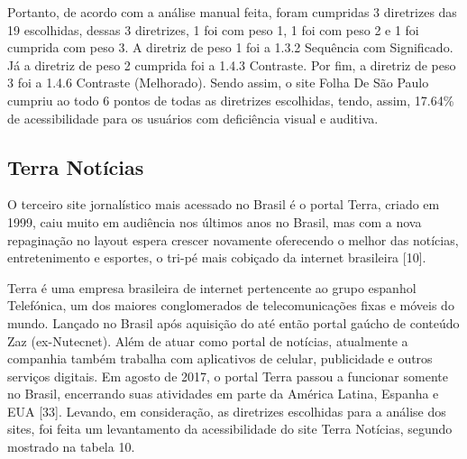 \documentclass[a4paper]{article}
\begin{document}
\begin{titlepage}
Portanto, de acordo com a análise manual feita, foram cumpridas 3 diretrizes das 19 escolhidas, dessas 3 diretrizes, 1 foi com peso 1, 1 foi com peso 2 e 1 foi cumprida com peso 3. A diretriz de peso 1 foi a 1.3.2 Sequência com Significado. Já a diretriz de peso 2 cumprida foi a 1.4.3 Contraste. Por fim, a diretriz de peso 3 foi a 1.4.6 Contraste (Melhorado). Sendo assim, o site Folha De São Paulo cumpriu ao todo 6 pontos de todas as diretrizes escolhidas, tendo, assim, 17.64\% de acessibilidade para os usuários com deficiência visual e auditiva.

\subsection{Terra Notícias}

O terceiro site jornalístico mais acessado no Brasil é o portal Terra, criado em 1999, caiu muito em audiência nos últimos anos no Brasil, mas com a nova repaginação no layout espera crescer novamente oferecendo o melhor das notícias, entretenimento e esportes, o tri-pé mais cobiçado da internet brasileira [10].

Terra é uma empresa brasileira de internet pertencente ao grupo espanhol Telefónica, um dos maiores conglomerados de telecomunicações fixas e móveis do mundo. Lançado no Brasil após aquisição do até então portal gaúcho de conteúdo Zaz (ex-Nutecnet). Além de atuar como portal de notícias, atualmente a companhia também trabalha com aplicativos de celular, publicidade e outros serviços digitais. Em agosto de 2017, o portal Terra passou a funcionar somente no Brasil, encerrando suas atividades em parte da América Latina, Espanha e EUA [33]. Levando, em consideração, as diretrizes escolhidas para a análise dos sites, foi feita um levantamento da acessibilidade do site Terra Notícias, segundo mostrado na tabela 10.\\


\end{titlepage}
\end{document}

